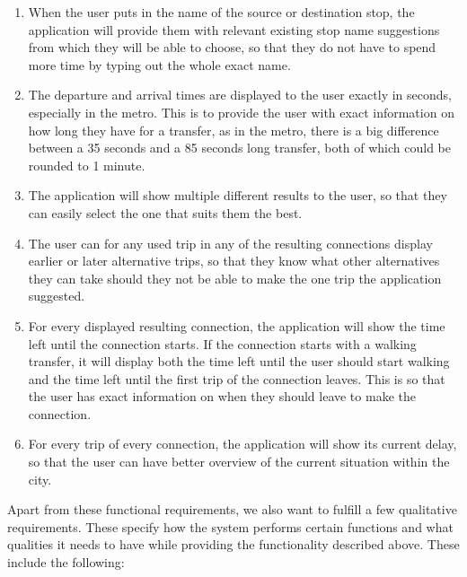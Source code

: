 \begin{enumerate}
\item When the user puts in the name of the source or destination stop, the application will provide them with relevant existing stop name suggestions from which they will be able to choose, so that they do not have to spend more time by typing out the whole exact name.
\label{req:stop_name_suggestions}

\item The departure and arrival times are displayed to the user exactly in seconds, especially in the metro. This is to provide the user with exact information on how long they have for a transfer, as in the metro, there is a big difference between a 35 seconds and a 85 seconds long transfer, both of which could be rounded to 1 minute.
\label{req:exact_times}

\item The application will show multiple different results to the user, so that they can easily select the one that suits them the best.
\label{req:multiple_results}

\item The user can for any used trip in any of the resulting connections display earlier or later alternative trips, so that they know what other alternatives they can take should they not be able to make the one trip the application suggested.
\label{req:trip_alternatives}

\item For every displayed resulting connection, the application will show the time left until the connection starts. If the connection starts with a walking transfer, it will display both the time left until the user should start walking and the time left until the first trip of the connection leaves. This is so that the user has exact information on when they should leave to make the connection.
\label{req:countdown}

\item For every trip of every connection, the application will show its current delay, so that the user can have better overview of the current situation within the city.
\label{req:delays}
\end{enumerate}


Apart from these functional requirements, we also want to fulfill a few qualitative requirements. These specify how the system performs certain functions and what qualities it needs to have while providing the functionality described above. These include the following:

